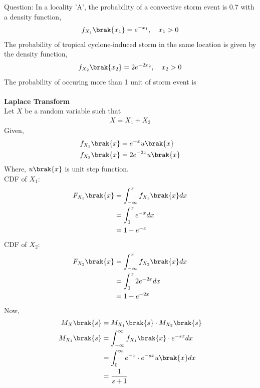 \documentclass[journal,12pt,twocolumn]{IEEEtran}
\theoremstyle{remark}
\begin{document}
%
Question:
In a locality 'A', the probability of a convective storm event is $0.7$ with a density function,
\begin{align}
f_{X_1}\brak{x_1} = e^{-x_1},\quad x_1>0
\end{align} 
The probability of tropical cyclone-induced storm in the same location is given by the density function,
\begin{align}
f_{X_2}\brak{x_2} = 2e^{-2x_2},\quad x_2>0
\end{align}
The probability of occuring more than 1 unit of storm event is\\
\solution\\
\textbf{Laplace Transform}\\
Let $X$ be a random variable such that 
\begin{align}
X = X_1 + X_2
\end{align}
Given,
\begin{align}
f_{X_1}\brak{x} &= e^{-x}u\brak{x}\\
f_{X_2}\brak{x} &= 2e^{-2x}u\brak{x}
\end{align}
Where, $u\brak{x}$ is unit step function.\\
CDF of $X_1$:
\begin{align}
F_{X_1}\brak{x} &= \int_{-\infty}^{x} f_{X_1}\brak{x}dx\\
&= \int_{0}^{x} e^{-x}dx\\
&= 1- e^{-x}
\end{align}
CDF of $X_2$:
\begin{align}
F_{X_2}\brak{x} &= \int_{-\infty}^{x} f_{X_2}\brak{x}dx\\
&= \int_{0}^{x} 2e^{-2x}dx\\
&= 1- e^{-2x}
\end{align}
Now,
\begin{align}
M_X\brak{s} &= M_{X_1}\brak{s} \cdot M_{X_2}\brak{s}\label{eq:1}\\
M_{X_1}\brak{s} &= \int_{-\infty}^{\infty} f_{X_1}\brak{x}\cdot e^{-sx}dx\\
&= \int_{0}^{\infty} e^{-x}\cdot e^{-sx}u\brak{x}dx\\
&= \frac{1}{s+1}\label{eq:2}
\end{align}
\end{document}
